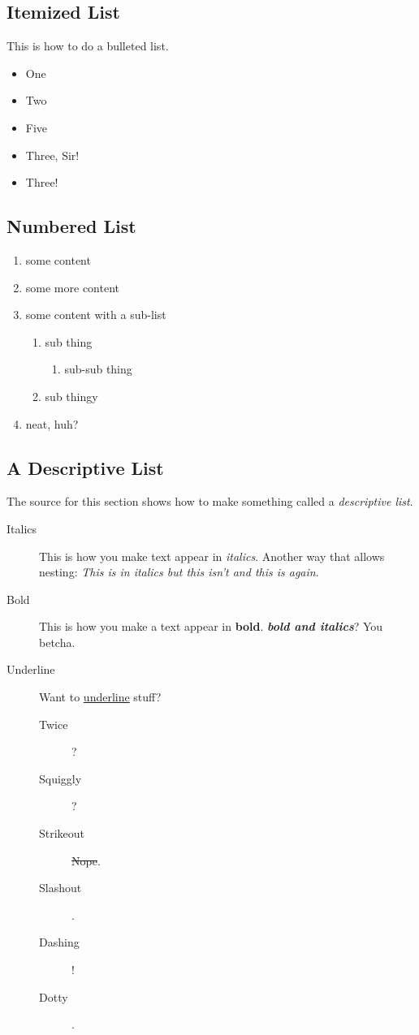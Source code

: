 \documentclass[11pt]{article} %
\begin{document}
\subsection{Itemized List}
This is how to do a bulleted list.

\begin{itemize}
\item One
\item Two
\item Five
\item Three, Sir!
\item Three!
\end{itemize}

\subsection{Numbered List}

\begin{enumerate}
\item some content
\item some more content
\item some content with a sub-list
	\begin{enumerate}
	\item sub thing
		\begin{enumerate}
		\item sub-sub thing
		\end{enumerate}
	\item sub thingy
	\end{enumerate}
\item neat, huh?
\end{enumerate}

\subsection{A Descriptive List}

The source for this section shows how to make something called a \emph{descriptive list}.

\begin{description}
\item [Italics]
This is how you make text appear in {\it italics}.  Another way that allows nesting: {\em This is in italics \em but this isn't \em and this is again}.
\item [Bold]
This is how you make a text appear in {\bf bold}.  {\bf \em bold \em and \em italics}? You betcha.
\item[Underline]
Want to \uline{underline} stuff?
	\begin{description}
	\item [Twice] ? 
	\item [Squiggly] ? 
	\item [Strikeout] \sout{Nope}.
	\item [Slashout] . 
	\item [Dashing] ! 
	\item [Dotty] .
	\end{description}
\end{description}
\end{document}
